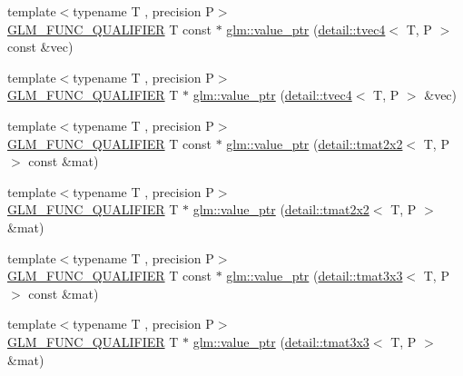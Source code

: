 \begin{DoxyCompactItemize}
\item 
{\footnotesize template$<$typename T , precision P$>$ }\\\hyperlink{setup_8hpp_a33fdea6f91c5f834105f7415e2a64407}{G\+L\+M\+\_\+\+F\+U\+N\+C\+\_\+\+Q\+U\+A\+L\+I\+F\+I\+ER} T const  $\ast$ \hyperlink{group__gtc__type__ptr_ga6963deec2c77b8a49b3f7e434914f6ba}{glm\+::value\+\_\+ptr} (\hyperlink{structglm_1_1detail_1_1tvec4}{detail\+::tvec4}$<$ T, P $>$ const \&vec)
\item 
{\footnotesize template$<$typename T , precision P$>$ }\\\hyperlink{setup_8hpp_a33fdea6f91c5f834105f7415e2a64407}{G\+L\+M\+\_\+\+F\+U\+N\+C\+\_\+\+Q\+U\+A\+L\+I\+F\+I\+ER} T $\ast$ \hyperlink{group__gtc__type__ptr_gaa3ed69a05293987972b589311e5feb23}{glm\+::value\+\_\+ptr} (\hyperlink{structglm_1_1detail_1_1tvec4}{detail\+::tvec4}$<$ T, P $>$ \&vec)
\item 
{\footnotesize template$<$typename T , precision P$>$ }\\\hyperlink{setup_8hpp_a33fdea6f91c5f834105f7415e2a64407}{G\+L\+M\+\_\+\+F\+U\+N\+C\+\_\+\+Q\+U\+A\+L\+I\+F\+I\+ER} T const  $\ast$ \hyperlink{group__gtc__type__ptr_ga013fcf415d78cc3aa9273c5d4f780325}{glm\+::value\+\_\+ptr} (\hyperlink{structglm_1_1detail_1_1tmat2x2}{detail\+::tmat2x2}$<$ T, P $>$ const \&mat)
\item 
{\footnotesize template$<$typename T , precision P$>$ }\\\hyperlink{setup_8hpp_a33fdea6f91c5f834105f7415e2a64407}{G\+L\+M\+\_\+\+F\+U\+N\+C\+\_\+\+Q\+U\+A\+L\+I\+F\+I\+ER} T $\ast$ \hyperlink{group__gtc__type__ptr_ga11e5b6c0d7d5d2627df624bb4b219f20}{glm\+::value\+\_\+ptr} (\hyperlink{structglm_1_1detail_1_1tmat2x2}{detail\+::tmat2x2}$<$ T, P $>$ \&mat)
\item 
{\footnotesize template$<$typename T , precision P$>$ }\\\hyperlink{setup_8hpp_a33fdea6f91c5f834105f7415e2a64407}{G\+L\+M\+\_\+\+F\+U\+N\+C\+\_\+\+Q\+U\+A\+L\+I\+F\+I\+ER} T const  $\ast$ \hyperlink{group__gtc__type__ptr_ga78acb1fd15ce7d1d2861493fac9693ec}{glm\+::value\+\_\+ptr} (\hyperlink{structglm_1_1detail_1_1tmat3x3}{detail\+::tmat3x3}$<$ T, P $>$ const \&mat)
\item 
{\footnotesize template$<$typename T , precision P$>$ }\\\hyperlink{setup_8hpp_a33fdea6f91c5f834105f7415e2a64407}{G\+L\+M\+\_\+\+F\+U\+N\+C\+\_\+\+Q\+U\+A\+L\+I\+F\+I\+ER} T $\ast$ \hyperlink{group__gtc__type__ptr_gaad64150511d5c6a2d2c7afec724e4064}{glm\+::value\+\_\+ptr} (\hyperlink{structglm_1_1detail_1_1tmat3x3}{detail\+::tmat3x3}$<$ T, P $>$ \&mat)

\end{DoxyCompactItemize}
